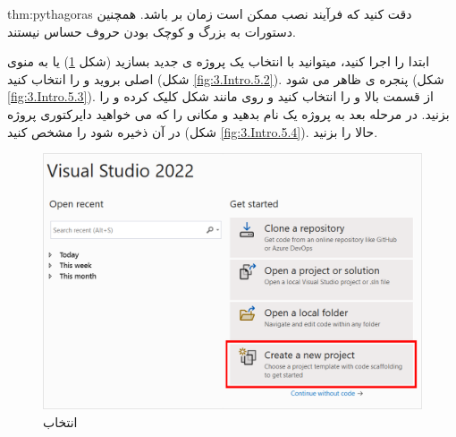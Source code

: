 \textbf{\vspace{-10pt}}

\begin{point}{thm:pythagoras}
{
    \Large
    دقت کنید که فرآیند نصب ممکن است زمان بر باشد. همچنین دستورات  به بزرگ و کوچک بودن حروف حساس نیستند.
}
\end{point}

\textbf{\vspace{-30pt}}
\title{
    \LARGE
}
\textbf{\vspace{-10pt}}

{
    \Large
    \begin{spacing}{1.5}
        ابتدا  را اجرا کنید، میتوانید با انتخاب  یک پروژه ی جدید بسازید (شکل \ref{fig:3.Intro.5.1}) یا به منوی اصلی بروید و  را انتخاب کنید (شکل \ref{fig:3.Intro.5.2}).
        پنجره ی  ظاهر می شود (شکل \ref{fig:3.Intro.5.3}).
        از قسمت بالا  و  را انتخاب کنید و روی  مانند شکل کلیک کرده و  را بزنید.
        در مرحله بعد به پروژه یک نام بدهید و مکانی را که می خواهید دایرکتوری پروژه در آن ذخیره شود را مشخص کنید (شکل \ref{fig:3.Intro.5.4}).
        حالا  را بزنید.

        \begin{figure}[H]
            \centering
            \setlength{\belowcaptionskip}{-10pt}
            \includegraphics[width=\textwidth]{Images/3/3.Intro.5.1}
            \caption{انتخاب }
            \label{fig:3.Intro.5.1}
        \end{figure}


\end{spacing}}
